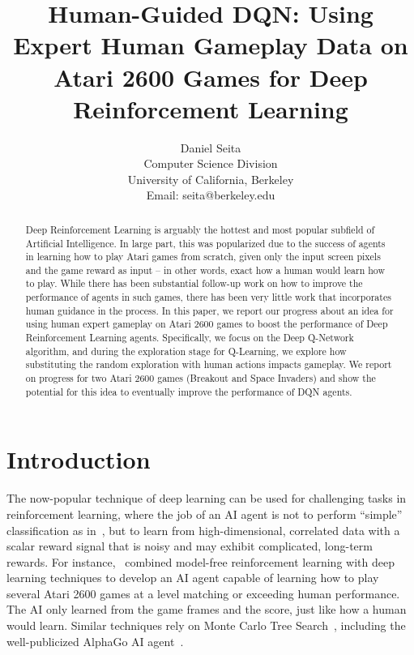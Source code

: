 \documentclass[letterpaper, 10pt, conference]{ieeeconf}
\title{\LARGE \bf Human-Guided DQN: Using Expert Human Gameplay Data on Atari
2600 Games for Deep Reinforcement Learning}
\author{Daniel Seita \\
Computer Science Division\\
University of California, Berkeley\\
Email: seita@berkeley.edu
}
\begin{document}
\maketitle

\begin{abstract}
Deep Reinforcement Learning is arguably the hottest and most popular subfield of
Artificial Intelligence. In large part, this was popularized due to the success
of agents in learning how to play Atari games from scratch, given only the input
screen pixels and the game reward as input -- in other words, exact how a human
would learn how to play. While there has been substantial follow-up work on how
to improve the performance of agents in such games, there has been very little
work that incorporates human guidance in the process. In this paper, we report
our progress about an idea for using human expert gameplay on Atari 2600 games
to boost the performance of Deep Reinforcement Learning agents. Specifically, we
focus on the Deep Q-Network algorithm, and during the exploration stage for
Q-Learning, we explore how substituting the random exploration with human
actions impacts gameplay. We report on progress for two Atari 2600 games
(Breakout and Space Invaders) and show the potential for this idea to eventually
improve the performance of DQN agents.
\end{abstract}

\section{Introduction}\label{sec:introduction}

The now-popular technique of deep learning can be used for challenging tasks in
reinforcement learning, where the job of an AI agent is not to perform
``simple'' classification as in~\cite{AlexNet2012}, but to learn from
high-dimensional, correlated data with a scalar reward signal that is noisy and
may exhibit complicated, long-term rewards. For instance,~\cite{mnih-dqn-2015}
combined model-free reinforcement learning with deep learning techniques to
develop an AI agent capable of learning how to play several Atari 2600 games at
a level matching or exceeding human performance. The AI only learned from the
game frames and the score, just like how a human would learn. Similar techniques
rely on Monte Carlo Tree Search~\cite{nips-atari-2014}, including the
well-publicized AlphaGo AI agent~\cite{silver-alphago-2016}.
\end{document}
